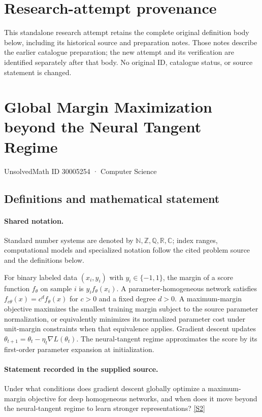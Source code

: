 \documentclass[11pt]{article}
\begin{document}
\section*{Research-attempt provenance}
This standalone research attempt retains the complete original definition body below,
including its historical source and preparation notes. Those notes describe the
earlier catalogue preparation; the new attempt and its verification are identified
separately after that body. No original ID, catalogue status, or source statement is changed.

\section{Global Margin Maximization beyond the Neural Tangent Regime}\label{30005254}
{\small UnsolvedMath ID 30005254 · Computer Science}
\subsection{Definitions and mathematical statement}

\paragraph{Shared notation.}Standard number systems are denoted by $\mathbb N,\mathbb Z,\mathbb Q,\mathbb R,\mathbb C$; index ranges, computational models and specialized notation follow the cited problem source and the definitions below.


For binary labeled data $(x_i,y_i)$ with $y_i\in\{-1,1\}$, the margin of a score function $f_\theta$ on sample $i$ is $y_i f_\theta(x_i)$. A parameter-homogeneous network satisfies $f_{c\theta}(x)=c^d f_\theta(x)$ for $c>0$ and a fixed degree $d>0$. A maximum-margin objective maximizes the smallest training margin subject to the source parameter normalization, or equivalently minimizes its normalized parameter cost under unit-margin constraints when that equivalence applies. Gradient descent updates $\theta_{t+1}=\theta_t-\eta_t\nabla L(\theta_t)$. The neural-tangent regime approximates the score by its first-order parameter expansion at initialization.
\paragraph{Statement recorded in the supplied source.}
Under what conditions does gradient descent globally optimize a maximum-margin objective for deep homogeneous networks, and when does it move beyond the neural-tangent regime to learn stronger representations? \href{https://doi.org/10.4171/owr/2022/46}{[S2]}
\end{document}

